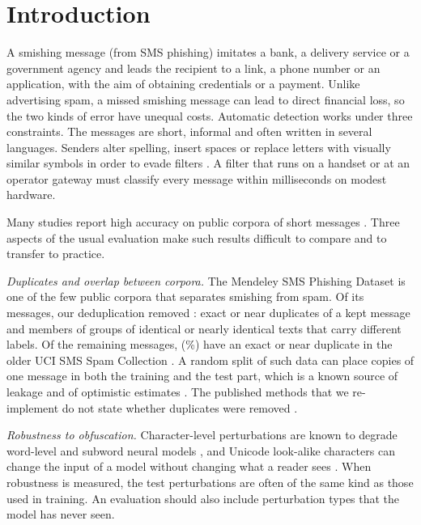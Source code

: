 \section{Introduction}\label{sec:intro}

A smishing message (from SMS phishing) imitates a bank, a delivery service or a government agency and leads the recipient to a link, a phone number or an application, with the aim of obtaining credentials or a payment. Unlike advertising spam, a missed smishing message can lead to direct financial loss, so the two kinds of error have unequal costs. Automatic detection works under three constraints. The messages are short, informal and often written in several languages. Senders alter spelling, insert spaces or replace letters with visually similar symbols in order to evade filters \cite{salman2024,boucher2022}. A filter that runs on a handset or at an operator gateway must classify every message within milliseconds on modest hardware.

Many studies report high accuracy on public corpora of short messages \cite{mishra2023dsmishsms,mishra2022detector,sonowal2020,roy2020,ghourabi2023,mahmud2024,shim2024}. Three aspects of the usual evaluation make such results difficult to compare and to transfer to practice.

\emph{Duplicates and overlap between corpora.} The Mendeley SMS Phishing Dataset \cite{mendeley2022,mishra2023dataset} is one of the few public corpora that separates smishing from spam. Of its  messages, our deduplication removed : exact or near duplicates of a kept message and members of  groups of identical or nearly identical texts that carry different labels. Of the  remaining messages,  (\%) have an exact or near duplicate in the older UCI SMS Spam Collection \cite{almeida2011}. A random split of such data can place copies of one message in both the training and the test part, which is a known source of leakage and of optimistic estimates \cite{kapoor2023,lee2022}. The published methods that we re-implement do not state whether duplicates were removed \cite{mahmud2024,shim2024}.

\emph{Robustness to obfuscation.} Character-level perturbations are known to degrade word-level and subword neural models \cite{gao2018,li2019,pruthi2019}, and Unicode look-alike characters can change the input of a model without changing what a reader sees \cite{boucher2022}. When robustness is measured, the test perturbations are often of the same kind as those used in training. An evaluation should also include perturbation types that the model has never seen.


